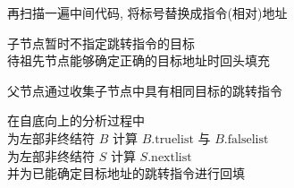 
\begin{frame}{}
  \begin{center}

    \vspace{0.60cm}

    \pause
    \vspace{0.80cm}
    再扫描一遍中间代码, 将标号替换成指令(相对)地址

    \pause
    \vspace{1.20cm}
  \end{center}
\end{frame}

\begin{frame}{}
  \begin{center}

    \vspace{0.30cm}

    \pause
    \vspace{0.50cm}
    子节点暂时不指定跳转指令的目标 \\[5pt]
    待祖先节点能够确定正确的目标地址时回头填充

    \pause
    \vspace{0.50cm}
    父节点通过收集子节点中具有相同目标的跳转指令
  \end{center}
\end{frame}

\begin{frame}{}
  \begin{center}
    在自底向上的分析过程中 \\[15pt]
    为左部非终结符 $B$ 计算 $B.\text{truelist}$ 与 $B.\text{falselist}$ \\[10pt]
    为左部非终结符 $S$ 计算 $S.\text{nextlist}$ \\[10pt]
    并为已能确定目标地址的跳转指令进行回填
  \end{center}
\end{frame}


